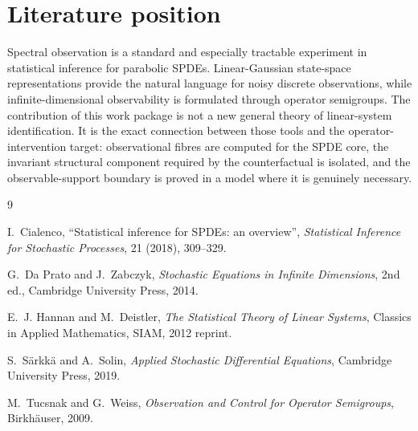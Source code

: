 \documentclass[11pt]{article}
\theoremstyle{remark}
\newcommand{\1}{\mathbf 1}
\begin{document}
\section*{Literature position}

Spectral observation is a standard and especially tractable experiment in statistical inference for parabolic SPDEs.  Linear-Gaussian state-space representations provide the natural language for noisy discrete observations, while infinite-dimensional observability is formulated through operator semigroups.  The contribution of this work package is not a new general theory of linear-system identification.  It is the exact connection between those tools and the operator-intervention target: observational fibres are computed for the SPDE core, the invariant structural component required by the counterfactual is isolated, and the observable-support boundary is proved in a model where it is genuinely necessary.

\begin{thebibliography}{9}

I.~Cialenco,
``Statistical inference for SPDEs: an overview'',
\emph{Statistical Inference for Stochastic Processes}, 21 (2018), 309--329.

G.~Da Prato and J.~Zabczyk,
\emph{Stochastic Equations in Infinite Dimensions}, 2nd ed.,
Cambridge University Press, 2014.

E.~J. Hannan and M.~Deistler,
\emph{The Statistical Theory of Linear Systems},
Classics in Applied Mathematics, SIAM, 2012 reprint.

S.~S\"arkk\"a and A.~Solin,
\emph{Applied Stochastic Differential Equations},
Cambridge University Press, 2019.

M.~Tucsnak and G.~Weiss,
\emph{Observation and Control for Operator Semigroups},
Birkh\"auser, 2009.

\end{thebibliography}
\end{document}
